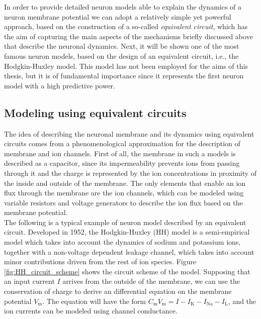 \documentclass[a4paper, 12pt, twoside, openright]{book}
\begin{document}
In order to provide detailed neuron models able to explain the dynamics of a neuron membrane potential we can adopt a relatively simple yet powerful approach, based on the construction of a so-called \textit{equivalent circuit}, which has the aim of capturing the main aspects of the mechanisms briefly discussed above that describe the neuronal dynamics. Next, it will be shown one of the most famous neuron models, based on the design of an equivalent circuit, i.e., the Hodgkin-Huxley model. This model has not been employed for the aims of this thesis, but it is of fundamental importance since it represents the first neuron model with a high predictive power.

\subsection{Modeling using equivalent circuits}
The idea of describing the neuronal membrane and its dynamics using equivalent circuits comes from a phenomenological approximation for the description of membrane and ion channels. First of all, the membrane in such a models is described as a capacitor, since its impermeability prevents ions from passing through it and the charge is represented by the ion concentrations in proximity of the inside and outside of the membrane. The only elements that enable an ion flux through the membrane are the ion channels, which can be modeled using variable resistors and voltage generators to describe the ion flux based on the membrane potential.\\
The following is a typical example of neuron model described by an equivalent circuit. Developed in 1952, the Hodgkin-Huxley (HH) model \cite{Hodgkin1952} is a semi-empirical model which takes into account the dynamics of sodium and potassium ions, together with a non-voltage dependent leakage channel, which takes into account minor contributions driven from the rest of ion species.
Figure \ref{fig:HH_circuit_scheme} shows the circuit scheme of the model. Supposing that an input current $I$ arrives from the outside of the membrane, we can use the conservation of charge to derive an differential equation on the membrane potential $V_{\text{m}}$. The equation will have the form $C_{\text{m}}\dot{V_{\text{m}}}=I-I_{\text{K}}-I_{\text{Na}}-I_{\text{L}}$, and the ion currents can be modeled using channel conductance.
\end{document}
